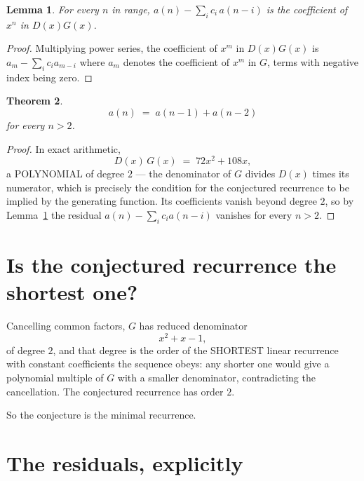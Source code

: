 \documentclass[11pt,a4paper]{article}
\theoremstyle{plain}
\newtheorem{theorem}{Theorem}
\newtheorem{lemma}[theorem]{Lemma}
\theoremstyle{definition}
\begin{document}
\begin{lemma}\label{lem:key}
For every $n$ in range, $a(n)-\sum_i c_i\,a(n-i)$ is the coefficient of $x^{n}$ in
$D(x)G(x)$.
\end{lemma}

\begin{proof}
Multiplying power series, the coefficient of $x^{m}$ in $D(x)G(x)$ is
$a_m-\sum_i c_i a_{m-i}$ where $a_m$ denotes the coefficient of $x^{m}$ in $G$, terms with
negative index being zero.
\end{proof}

\begin{theorem}
\[
a(n)\;=\;a(n-1) + a(n-2)
\]
for every $n>2$.
\end{theorem}

\begin{proof}
In exact arithmetic,
\[
D(x)\,G(x)\;=\;72 x^{2} + 108 x,
\]
a POLYNOMIAL of degree $2$ --- the denominator of $G$ divides $D(x)$ times its numerator,
which is precisely the condition for the conjectured recurrence to be implied by the
generating function. Its coefficients vanish beyond degree $2$, so by
Lemma~\ref{lem:key} the residual $a(n)-\sum_ic_ia(n-i)$ vanishes for every
$n>2$.
\end{proof}

\section{Is the conjectured recurrence the shortest one?}

Cancelling common factors, $G$ has reduced denominator
\[
x^{2} + x - 1,
\]
of degree $2$, and that degree is the order of the SHORTEST linear recurrence with
constant coefficients the sequence obeys: any shorter one would give a polynomial multiple of
$G$ with a smaller denominator, contradicting the cancellation. The conjectured recurrence has
order $2$.

So the conjecture is the minimal recurrence.

\section{The residuals, explicitly}
\end{document}

